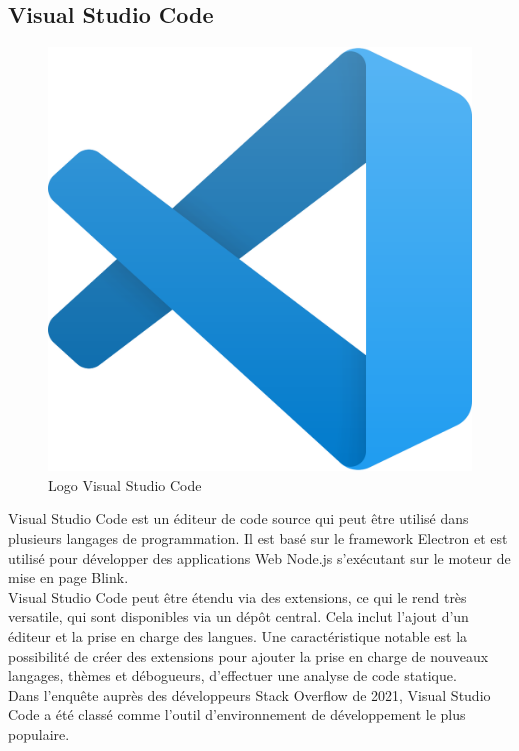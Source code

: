     \subsection{Visual Studio Code}
    \begin{figure}[H]
        \centering
        \includegraphics[scale=0.1]{ACR/vscode-logo.png}
        \caption{Logo Visual Studio Code}
    \end{figure}

    Visual Studio Code\cite{vscode} est un éditeur de code source qui peut être utilisé dans plusieurs langages de programmation. Il est basé sur le framework Electron et est utilisé pour développer des applications Web Node.js s'exécutant sur le moteur de mise en page Blink.\\
    
    Visual Studio Code peut être étendu via des extensions, ce qui le rend très versatile, qui sont disponibles via un dépôt central. Cela inclut l'ajout d'un éditeur et la prise en charge des langues. Une caractéristique notable est la possibilité de créer des extensions pour ajouter la prise en charge de nouveaux langages, thèmes et débogueurs, d'effectuer une analyse de code statique.\\
    
    Dans l'enquête auprès des développeurs Stack Overflow de 2021, Visual Studio Code a été classé comme l'outil d'environnement de développement le plus populaire.

